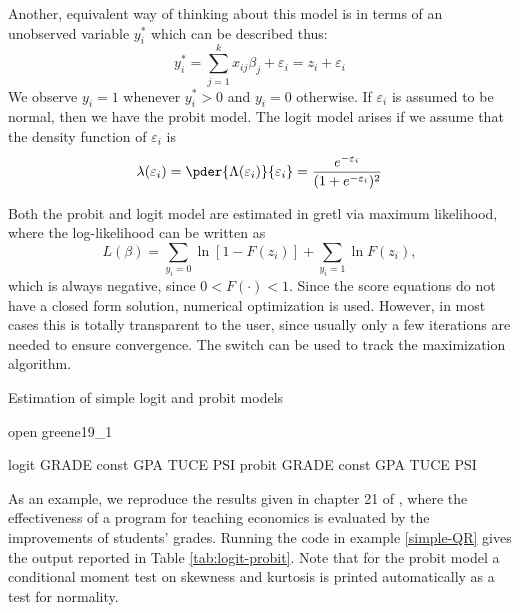 Another, equivalent way of thinking about this model is in terms of
an unobserved variable $y^*_i$ which can be described thus:
%
\begin{equation}
  \label{eq:qr-latent}
  y^*_i = \sum_{j=1}^k x_{ij} \beta_j + \varepsilon_i = z_i  +
  \varepsilon_i 
\end{equation}
%
We observe $y_i = 1$ whenever $y^*_i > 0$ and $y_i = 0$ otherwise. If
$\varepsilon_i$ is assumed to be normal, then we have the probit
model. The logit model arises if we assume that the density function
of $\varepsilon_i$ is
%
\[
  \lambda(\varepsilon_i) =
  \pder{\Lambda(\varepsilon_i)}{\varepsilon_i} =
  \frac{e^{-\varepsilon_i}}{(1 + e^{-\varepsilon_i})^2}
\]

Both the probit and logit model are estimated in gretl via
maximum likelihood, where the log-likelihood can be written as
\begin{equation}
  \label{eq:qr-loglik}
  L(\beta) = \sum_{y_i=0} \ln [ 1 - F(z_i)] + \sum_{y_i=1} \ln F(z_i),
\end{equation}
which is always negative, since $0 < F(\cdot) < 1$.  Since the score
equations do not have a closed form solution, numerical optimization
is used. However, in most cases this is totally transparent to the
user, since usually only a few iterations are needed to ensure
convergence. The  switch can be used to track the
maximization algorithm.

\begin{script}[htbp]
  \caption{Estimation of simple logit and probit models}
  \label{simple-QR}
\begin{scode}
open greene19_1

logit GRADE const GPA TUCE PSI
probit GRADE const GPA TUCE PSI
\end{scode}
\end{script}

As an example, we reproduce the results given in chapter 21 of
\cite{greene00}, where the effectiveness of a program for teaching
economics is evaluated by the improvements of students' grades.
Running the code in example \ref{simple-QR} gives the output reported
in Table \ref{tab:logit-probit}. Note that for the probit model a
conditional moment test on skewness and kurtosis \citep*{JBL84} is
printed automatically as a test for normality.


